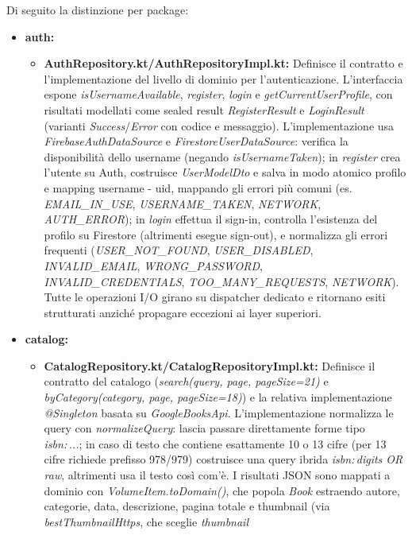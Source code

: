 \documentclass{article}
\begin{document}
Di seguito la distinzione per package:
\begin{itemize}
  \item \textbf{auth:}
  \begin{itemize}
    \item \textbf{AuthRepository.kt/AuthRepositoryImpl.kt:} Definisce il contratto e l’implementazione del livello di dominio per l’autenticazione. L’interfaccia espone \textit{isUsernameAvailable}, \textit{register}, \textit{login} e \textit{getCurrentUserProfile}, 
    con risultati modellati come sealed result \textit{RegisterResult} e \textit{LoginResult} (varianti \textit{Success}/\textit{Error} con codice e messaggio). L’implementazione usa \textit{FirebaseAuthDataSource} e \textit{FirestoreUserDataSource}: 
    verifica la disponibilità dello username (negando \textit{isUsernameTaken}); in \textit{register} crea l’utente su Auth, costruisce \textit{UserModelDto} e salva in modo atomico profilo e mapping username - uid, 
    mappando gli errori più comuni (es. \textit{EMAIL\_IN\_USE}, \textit{USERNAME\_TAKEN}, \textit{NETWORK}, \textit{AUTH\_ERROR}); in \textit{login} effettua il sign-in, controlla l’esistenza del profilo su Firestore (altrimenti esegue sign-out),
    e normalizza gli errori frequenti (\textit{USER\_NOT\_FOUND}, \textit{USER\_DISABLED}, \textit{INVALID\_EMAIL}, \textit{WRONG\_PASSWORD}, \textit{INVALID\_CREDENTIALS}, \textit{TOO\_MANY\_REQUESTS}, \textit{NETWORK}). 
    Tutte le operazioni I/O girano su dispatcher dedicato e ritornano esiti strutturati anziché propagare eccezioni ai layer superiori.
  \end{itemize}
  \item \textbf{catalog:}
  \begin{itemize}
    \item \textbf{CatalogRepository.kt/CatalogRepositoryImpl.kt:} Definisce il contratto del catalogo (\textit{search(query, page, pageSize=21)} e \textit{byCategory(category, page, pageSize=18)}) e la relativa implementazione \textit{@Singleton} basata su \textit{GoogleBooksApi}. 
    L’implementazione normalizza le query con \textit{normalizeQuery}: lascia passare direttamente forme tipo \textit{isbn:\,...}; in caso di testo che contiene esattamente 10 o 13 cifre (per 13 cifre richiede prefisso 978/979) costruisce una query ibrida \textit{isbn:\,digits OR raw}, 
    altrimenti usa il testo così com’è. I risultati JSON sono mappati a dominio con \textit{VolumeItem.toDomain()}, che popola \textit{Book} estraendo autore, categorie, data, descrizione, pagina totale e thumbnail (via \textit{bestThumbnailHttps}, che sceglie \textit{thumbnail} 

\end{itemize}
\end{itemize}
\end{document}
